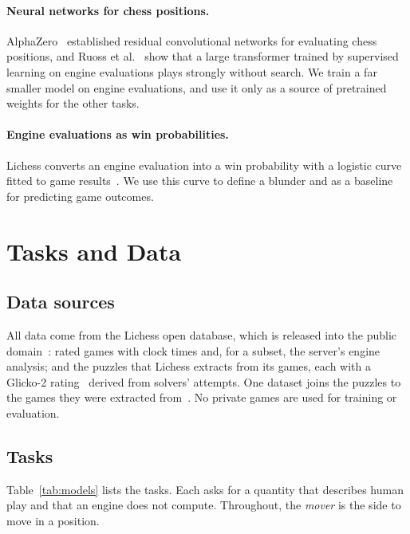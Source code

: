 \documentclass[11pt]{article}
\begin{document}
\paragraph{Neural networks for chess positions.}
AlphaZero~\cite{alphazero} established residual convolutional networks for
evaluating chess positions, and Ruoss et al.~\cite{searchless} show that a
large transformer trained by supervised learning on engine evaluations plays
strongly without search. We train a far smaller model on engine evaluations,
and use it only as a source of pretrained weights for the other tasks.

\paragraph{Engine evaluations as win probabilities.}
Lichess converts an engine evaluation into a win probability with a logistic
curve fitted to game results~\cite{lichessaccuracy,lilawinchances}. We use
this curve to define a blunder and as a baseline for predicting game
outcomes.

\section{Tasks and Data}
\label{sec:models}

\subsection{Data sources}

All data come from the Lichess open database, which is released into the
public domain~\cite{lichessdb}: rated games with clock times and, for a
subset, the server's engine analysis; and the puzzles that Lichess extracts
from its games, each with a Glicko-2 rating~\cite{glicko2} derived from
solvers' attempts. One dataset joins the puzzles to the games they were
extracted from~\cite{puzzlegames}. No private games are used for training or
evaluation.

\subsection{Tasks}

Table~\ref{tab:models} lists the tasks. Each asks for a quantity that
describes human play and that an engine does not compute. Throughout, the
\emph{mover} is the side to move in a position.

\begin{table}[htbp]\centering\small
{}
\caption{The tasks: the prediction target, the number of examples in the
dataset, the number of examples in the test set and of games they come from,
and the primary metric ($\downarrow$: lower is better; $\uparrow$: higher is
better). The positions of , the pretraining task, are
not grouped into games, so each counts as its own game.}
\label{tab:models}
\end{table}
\end{document}
